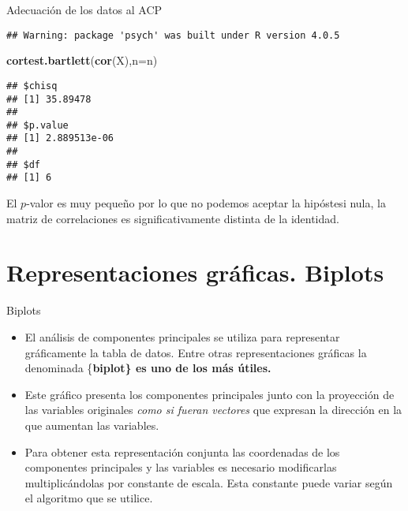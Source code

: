 \documentclass[
  spanish,
  ignorenonframetext,
]{beamer}
\newenvironment{Shaded}{\begin{snugshade}}{\end{snugshade}}
\newcommand{\DataTypeTok}[1]{\textcolor[rgb]{0.13,0.29,0.53}{#1}}
\newcommand{\KeywordTok}[1]{\textcolor[rgb]{0.13,0.29,0.53}{\textbf{#1}}}
\newcommand{\NormalTok}[1]{#1}
\providecommand{\tightlist}{%
  \setlength{\itemsep}{0pt}\setlength{\parskip}{0pt}}
\begin{document}
\begin{frame}[fragile]{Adecuación de los datos al ACP}
\begin{verbatim}
## Warning: package 'psych' was built under R version 4.0.5
\end{verbatim}

\begin{Shaded}
\begin{Highlighting}[]
\KeywordTok{cortest.bartlett}\NormalTok{(}\KeywordTok{cor}\NormalTok{(X),}\DataTypeTok{n=}\NormalTok{n)}
\end{Highlighting}
\end{Shaded}

\begin{verbatim}
## $chisq
## [1] 35.89478
## 
## $p.value
## [1] 2.889513e-06
## 
## $df
## [1] 6
\end{verbatim}

El \(p\)-valor es muy pequeño por lo que no podemos aceptar la hipóstesi
nula, la matriz de correlaciones es significativamente distinta de la
identidad.
\end{frame}

\hypertarget{representaciones-gruxe1ficas.-biplots}{%
\section{Representaciones gráficas.
Biplots}\label{representaciones-gruxe1ficas.-biplots}}

\begin{frame}{Biplots}
\protect\hypertarget{biplots}{}
\begin{itemize}
\tightlist
\item
  El análisis de componentes principales se utiliza para representar
  gráficamente la tabla de datos. Entre otras representaciones gráficas
  la denominada \{\bf biplot\} es uno de los más útiles.
\item
  Este gráfico presenta los componentes principales junto con la
  proyección de las variables originales \emph{como si fueran vectores}
  que expresan la dirección en la que aumentan las variables.
\item
  Para obtener esta representación conjunta las coordenadas de los
  componentes principales y las variables es necesario modificarlas
  multiplicándolas por constante de escala. Esta constante puede variar
  según el algoritmo que se utilice.
\end{itemize}
\end{frame}
\end{document}
